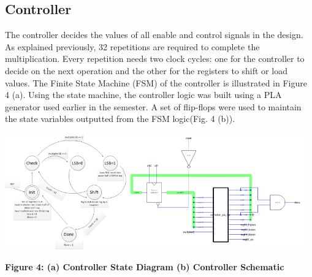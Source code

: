 \documentclass{report}
\begin{document}
 \subsection*{Controller}
 The controller decides the values of all enable and control signals in the design. As explained previously, 32 repetitions are required to complete the multiplication. Every repetition needs two clock cycles: one for the controller to decide on the next operation and the other for the registers to shift or load values. The Finite State Machine (FSM) of the controller is illustrated in Figure 4 (a).
 Using the state machine, the controller logic was built using a PLA generator used earlier in the semester. A set of flip-flops were used to maintain the state variables outputted from the FSM logic(Fig. 4 (b)).
 \begin{center} \includegraphics[height=5cm]{controller_state.png}\includegraphics[height=5cm]{controller_schem.png}	\end{center}
   \begin{center}\bf Figure 4: (a) Controller State Diagram (b) Controller Schematic\end{center}
\end{document}
